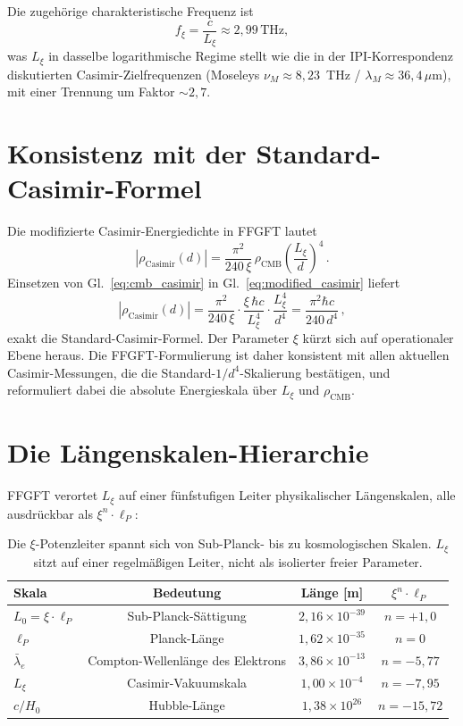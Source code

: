 \documentclass[11pt,a4paper]{article}
\begin{document}
Die zugehörige charakteristische Frequenz ist
\[
f_\xi = \frac{c}{L_\xi} \approx 2{,}99\,\text{THz},
\]
was $L_\xi$ in dasselbe logarithmische Regime stellt wie die in der IPI-Korrespondenz diskutierten Casimir-Zielfrequenzen (Moseleys $\nu_M \approx 8{,}23$~THz / $\lambda_M \approx 36{,}4\,\mu$m), mit einer Trennung um Faktor $\sim 2{,}7$.

\section{Konsistenz mit der Standard-Casimir-Formel}

Die modifizierte Casimir-Energiedichte in FFGFT lautet
\begin{equation}
|\rho_{\mathrm{Casimir}}(d)| = \frac{\pi^2}{240\,\xi}\,\rho_{\mathrm{CMB}}\left(\frac{L_\xi}{d}\right)^4\,.
\label{eq:modified_casimir}
\end{equation}
Einsetzen von Gl.~\eqref{eq:cmb_casimir} in Gl.~\eqref{eq:modified_casimir} liefert
\begin{equation}
|\rho_{\mathrm{Casimir}}(d)| = \frac{\pi^2}{240\,\xi}\cdot\frac{\xi\,\hbar c}{L_\xi^4}\cdot\frac{L_\xi^4}{d^4} = \frac{\pi^2 \hbar c}{240\,d^4}\,,
\end{equation}
exakt die Standard-Casimir-Formel. Der Parameter $\xi$ kürzt sich auf operationaler Ebene heraus. Die FFGFT-Formulierung ist daher konsistent mit allen aktuellen Casimir-Messungen, die die Standard-$1/d^4$-Skalierung bestätigen, und reformuliert dabei die absolute Energieskala über $L_\xi$ und $\rho_{\mathrm{CMB}}$.

\section{Die Längenskalen-Hierarchie}

FFGFT verortet $L_\xi$ auf einer fünfstufigen Leiter physikalischer Längenskalen, alle ausdrückbar als $\xi^n \cdot \ell_P$:

\begin{table}[h]
\centering
\small
\begin{tabular}{lccc}
\toprule
\textbf{Skala} & \textbf{Bedeutung} & \textbf{Länge [m]} & $\xi^n \cdot \ell_P$ \\
\midrule
$L_0 = \xi \cdot \ell_P$ & Sub-Planck-Sättigung & $2{,}16 \times 10^{-39}$ & $n = +1{,}0$ \\
$\ell_P$ & Planck-Länge & $1{,}62 \times 10^{-35}$ & $n = 0$ \\
$\bar\lambda_e$ & Compton-Wellenlänge des Elektrons & $3{,}86 \times 10^{-13}$ & $n = -5{,}77$ \\
$L_\xi$ & Casimir-Vakuumskala & $1{,}00 \times 10^{-4}$ & $n = -7{,}95$ \\
$c/H_0$ & Hubble-Länge & $1{,}38 \times 10^{26}$ & $n = -15{,}72$ \\
\bottomrule
\end{tabular}
\caption{Die $\xi$-Potenzleiter spannt sich von Sub-Planck- bis zu kosmologischen Skalen. $L_\xi$ sitzt auf einer regelmäßigen Leiter, nicht als isolierter freier Parameter.}
\end{table}
\end{document}
